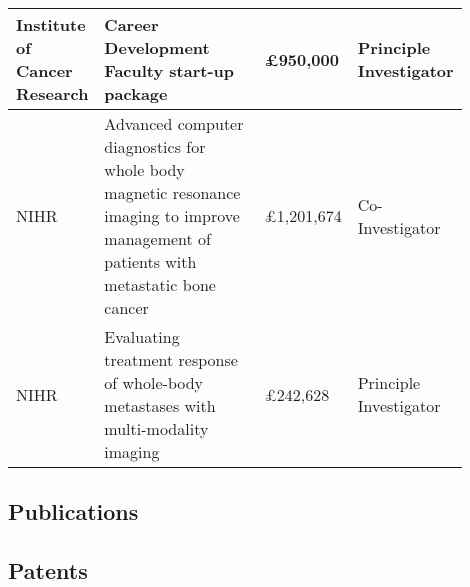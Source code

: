 \documentclass[]{mbcv}
\begin{document}
\begin{table}[htp]
\begin{center}
\begin{tabular}{|P{0.15\linewidth}|P{0.5\linewidth}|P{0.1\linewidth}|P{0.15\linewidth}|}
\hline
Institute of Cancer Research & Career Development Faculty start-up package & £950,000 & Principle Investigator \\
\hline
NIHR & Advanced computer diagnostics for whole body magnetic resonance imaging to improve management of patients with metastatic bone cancer & £1,201,674 & Co-Investigator \\
\hline
NIHR & Evaluating treatment response of whole-body metastases with multi-modality imaging & £242,628 & Principle Investigator \\
\hline
\end{tabular}
\end{center}
\end{table}

\begin{refsection}
\nocite{*}
\section{Publications}
\vspace*{10pt}
\printbibliography[heading=none]
\end{refsection}

\begin{refsection}
\nocite{*}
\section{Patents}
\vspace*{10pt}
\printbibliography[heading=none]
\end{refsection}

\end{document}
